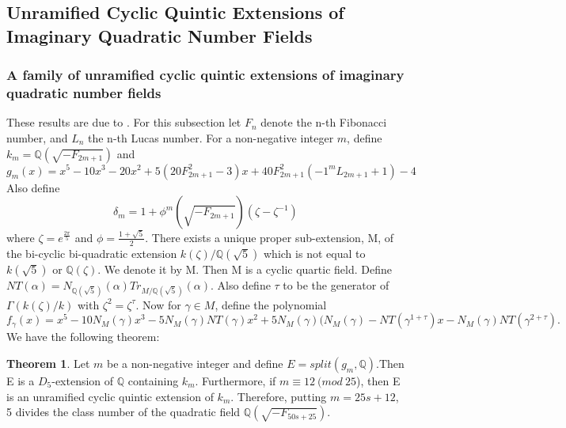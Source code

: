\documentclass[12pt]{extarticle}
\newcommand{\Q}{\mathbb{Q}}
\newcommand{\<}{\langle}
\renewcommand{\>}{\rangle}
\theoremstyle{definition}
\newtheorem{theorem}{Theorem}
\begin{document}
\subsection{Unramified Cyclic Quintic Extensions of Imaginary Quadratic Number Fields}
\subsubsection{A family of unramified cyclic quintic extensions of imaginary quadratic number fields}
These results are due to \cite{KISH}. For this subsection let $F_n$ denote the n-th Fibonacci number, and $L_n$ the n-th Lucas number. For a non-negative integer $m$, define $k_m = \Q(\sqrt{-F_{2m+1}})$ and \begin{equation}
    g_m(x) = x^5 - 10x^3  -20x^2 + 
    5(20F^2_{2m+1} - 3)x
    + 40F^2_{2m+1}(-1^{m}L_{2m+1} + 1)- 4
\end{equation} 
Also define \begin{equation}
    \delta_m = 1+\phi^m(\sqrt{-F_{2m+1}})(\zeta-\zeta^{-1})
\end{equation} where $\zeta = e^{\frac{2\pi}{5}}$ and $\phi = \frac{1+\sqrt{5}}{2}$. There exists a unique proper sub-extension, M, of the bi-cyclic bi-quadratic
extension $k(\zeta)/\Q(\sqrt{5})$ which is not equal to $k(\sqrt{5})$ or $\Q(\zeta)$. We denote it by M. Then M is a cyclic quartic field. Define $NT(\alpha) = N_{\Q(\sqrt{5})}(\alpha)Tr_{M/\Q(\sqrt{5})}(\alpha)$. Also define $\tau$ to be the generator of $\Gamma(k(\zeta)/k)$ with $\zeta^2=\zeta^\tau$.
Now for $\gamma \in M$, define the polynomial \begin{equation}
    f_\gamma(x) = x^5 - 10N_M(\gamma)x^3 - 5N_M(\gamma)NT (\gamma)x^2
+ 5N_M(\gamma)(N_M(\gamma) - NT(\gamma^{1+\tau})x - N_M(\gamma)NT(\gamma^{2+\tau}) 
.
\end{equation}
We have the following theorem: \begin{theorem}
    Let $m$ be a non-negative integer and define $E = split(g_m,\Q)$.Then E is a $D_5$-extension
of $\Q$ containing $k_m$. Furthermore, if $m \equiv 12 \:(mod\:25$), then E is an unramified cyclic quintic extension of $k_m$. Therefore, putting $m = 25s + 12$, 5 divides the class number of the quadratic field $\Q(\sqrt{-F_{50s+25}})$.
\end{theorem}
\end{document}
